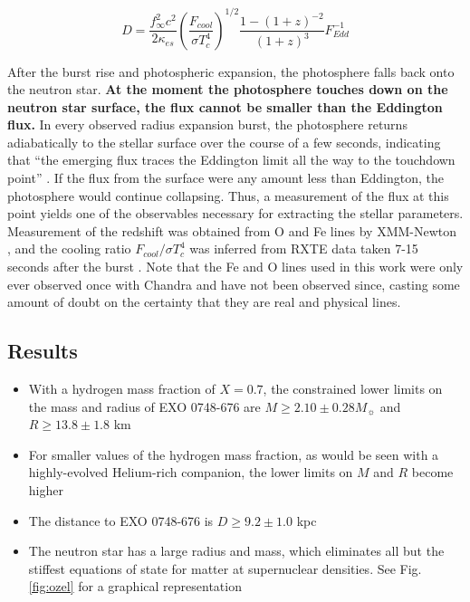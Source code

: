 \documentclass[onecolumn]{aastex63}
\begin{document}
\begin{equation} \label{radius}
    D = \frac{f_\infty^2 c^2}{2\kappa_{es}} \left(\frac{F_{cool}}{\sigma T_c^4}\right)^{1/2} \frac{1 - (1 + z)^{-2}}{(1 + z)^3} F_{Edd}^{-1}
\end{equation}
\vspace{0.5cm}


After the burst rise and photospheric expansion, the photosphere falls back onto the neutron star. \textbf{At the moment the photosphere touches down on the neutron star surface, the flux cannot be smaller than the Eddington flux.} In every observed radius expansion burst, the photosphere returns adiabatically to the stellar surface over the course of a few seconds, indicating that ``the emerging flux traces the Eddington limit all the way to the touchdown point'' \citep{ozel2006}. If the flux from the surface were any amount less than Eddington, the photosphere would continue collapsing. Thus, a measurement of the flux at this point yields one of the observables necessary for extracting the stellar parameters. Measurement of the redshift was obtained from O and Fe lines by XMM-Newton \citep{cottam2002}, and the cooling ratio $F_{cool}/\sigma T_c^4$ was inferred from RXTE data taken 7-15 seconds after the burst \citep{wolff2005}. Note that the Fe and O lines used in this work were only ever observed once with Chandra and have not been observed since, casting some amount of doubt on the certainty that they are real and physical lines.

\subsection{Results}

\begin{itemize}
    \item With a hydrogen mass fraction of $X = 0.7$, the constrained lower limits on the mass and radius of EXO 0748-676 are $M \ge 2.10 \pm 0.28 M_\sun$ and $R \ge 13.8 \pm 1.8$ km
    \item For smaller values of the hydrogen mass fraction, as would be seen with a highly-evolved Helium-rich companion, the lower limits on $M$ and $R$ become higher
    \item The distance to EXO 0748-676 is $D \ge 9.2 \pm 1.0$ kpc
    \item The neutron star has a large radius and mass, which eliminates all but the stiffest equations of state for matter at supernuclear densities. See Fig. \ref{fig:ozel} for a graphical representation
\end{itemize}
\end{document}
